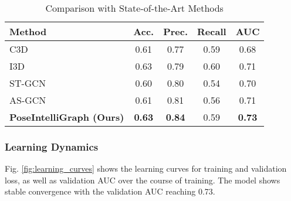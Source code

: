 \documentclass[conference]{IEEEtran}
\begin{document}
\begin{table}[htbp]
    \caption{Comparison with State-of-the-Art Methods}
    \begin{center}
        \begin{tabular}{|l|c|c|c|c|}
            \hline
            \textbf{Method}                  & \textbf{Acc.} & \textbf{Prec.} & \textbf{Recall} & \textbf{AUC}  \\
            \hline
            C3D \cite{wu2020not}             & 0.61          & 0.77           & 0.59            & 0.68          \\
            \hline
            I3D \cite{carreira2017quo}       & 0.63          & 0.79           & 0.60            & 0.71          \\
            \hline
            ST-GCN \cite{yan2018spatial}     & 0.60          & 0.80           & 0.54            & 0.70          \\
            \hline
            AS-GCN \cite{li2019actional}     & 0.61          & 0.81           & 0.56            & 0.71          \\
            \hline
            \textbf{PoseIntelliGraph (Ours)} & \textbf{0.63} & \textbf{0.84}  & 0.59            & \textbf{0.73} \\
            \hline
        \end{tabular}
        \label{tab:comparison}
    \end{center}
\end{table}

\subsubsection{Learning Dynamics}
Fig. \ref{fig:learning_curves} shows the learning curves for training and
validation loss, as well as validation AUC over the course of training. The
model shows stable convergence with the validation AUC reaching 0.73.
\end{document}
